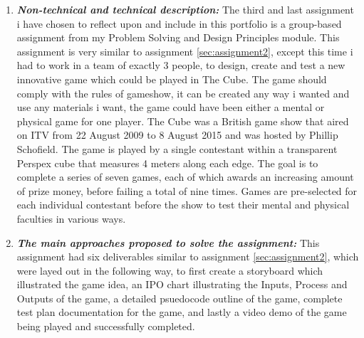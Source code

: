 \documentclass[12pt]{article}
\begin{document}
\begin{enumerate}
\item \textbf{\emph{Non-technical and technical description: }} The third and last assignment i have chosen to reflect upon and include in this portfolio is a group-based assignment from my Problem Solving and Design Principles module. This assignment is very similar to assignment  \ref{sec:assignment2}, except this time i had to work in a team of exactly 3 people, to design, create and test a new innovative game which could be played in The Cube. The game should comply with the rules of gameshow, it can be created any way i wanted and use any materials i want, the game could have been either a mental or physical game for one player. The Cube was a British game show that aired on ITV from 22 August 2009 to 8 August 2015 and was hosted by Phillip Schofield. The game is played by a single contestant within a transparent Perspex cube that measures 4 meters along each edge. The goal is to complete a series of seven games, each of which awards an increasing amount of prize money, before failing a total of nine times. Games are pre-selected for each individual contestant before the show to test their mental and physical faculties in various ways. 


\item \textbf{\emph{The main approaches proposed to solve the assignment: }} This assignment had six deliverables similar to assignment \ref{sec:assignment2}, which were layed out in the following way, to first create a storyboard which illustrated the game idea, an IPO chart illustrating the Inputs, Process and Outputs of the game, a detailed psuedocode outline of the game, complete test plan documentation for the game, and lastly a video demo of the game being played and successfully completed.




\end{enumerate}
\end{document}
